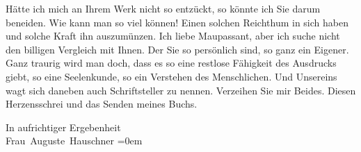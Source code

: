 \pstart
           Hätte ich mich an Ihrem Werk
               nicht so entzückt, so könnte ich Sie darum beneiden. Wie kann man so viel können!
               Einen solchen Reichthum in sich haben und solche Kraft ihn auszumünzen. Ich liebe Maupassant, aber ich suche nicht den billigen
               Vergleich mit Ihnen. Der Sie so persönlich sind, so ganz ein Eigener. {\pb}Ganz traurig wird man doch, dass es so eine restlose
               Fähigkeit des Ausdrucks giebt, so eine Seelenkunde, so ein Verstehen des
               Menschlichen. Und Unsereins wagt sich daneben auch Schriftsteller zu nennen.
               Verzeihen Sie mir Beides. Diesen Herzensschrei und das Senden meines Buchs.\pend
           
\pstart
           In aufrichtiger Ergebenheit{\\[\baselineskip]}\spacefill\mbox{Frau Auguste Hauschner}\pend
           \leftskip=0em{}\endnumbering{}  \newcommand{\dateiname}{L02586}\newcommand{\titel}{Auguste Hauschner an Arthur Schnitzler, 17. 6. 1908}\newcommand{\editorInnen}{Martin Anton Müller und Laura Untner}
